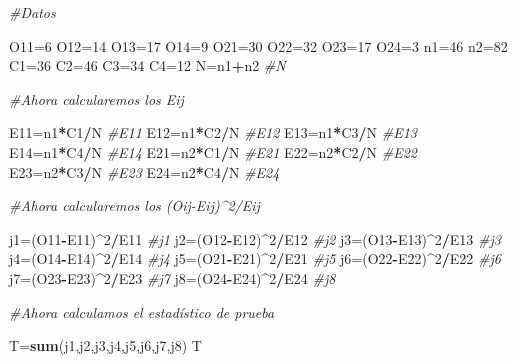 \documentclass[a4paper,oneside,openany]{book}
\newenvironment{Shaded}{\begin{snugshade}}{\end{snugshade}}
\newcommand{\KeywordTok}[1]{\textcolor[rgb]{0.13,0.29,0.53}{\textbf{#1}}}
\newcommand{\DecValTok}[1]{\textcolor[rgb]{0.00,0.00,0.81}{#1}}
\newcommand{\CommentTok}[1]{\textcolor[rgb]{0.56,0.35,0.01}{\textit{#1}}}
\newcommand{\OperatorTok}[1]{\textcolor[rgb]{0.81,0.36,0.00}{\textbf{#1}}}
\newcommand{\NormalTok}[1]{#1}
\begin{document}
\begin{Shaded}
\begin{Highlighting}[]
\CommentTok{#Datos}

\NormalTok{O11=}\DecValTok{6}
\NormalTok{O12=}\DecValTok{14}
\NormalTok{O13=}\DecValTok{17}
\NormalTok{O14=}\DecValTok{9}
\NormalTok{O21=}\DecValTok{30}
\NormalTok{O22=}\DecValTok{32}
\NormalTok{O23=}\DecValTok{17}
\NormalTok{O24=}\DecValTok{3}
\NormalTok{n1=}\DecValTok{46}
\NormalTok{n2=}\DecValTok{82}
\NormalTok{C1=}\DecValTok{36}
\NormalTok{C2=}\DecValTok{46}
\NormalTok{C3=}\DecValTok{34}
\NormalTok{C4=}\DecValTok{12}
\NormalTok{N=n1}\OperatorTok{+}\NormalTok{n2}
\CommentTok{#N}

\CommentTok{#Ahora calcularemos los Eij}

\NormalTok{E11=n1}\OperatorTok{*}\NormalTok{C1}\OperatorTok{/}\NormalTok{N}
\CommentTok{#E11}
\NormalTok{E12=n1}\OperatorTok{*}\NormalTok{C2}\OperatorTok{/}\NormalTok{N}
\CommentTok{#E12}
\NormalTok{E13=n1}\OperatorTok{*}\NormalTok{C3}\OperatorTok{/}\NormalTok{N}
\CommentTok{#E13}
\NormalTok{E14=n1}\OperatorTok{*}\NormalTok{C4}\OperatorTok{/}\NormalTok{N}
\CommentTok{#E14}
\NormalTok{E21=n2}\OperatorTok{*}\NormalTok{C1}\OperatorTok{/}\NormalTok{N}
\CommentTok{#E21}
\NormalTok{E22=n2}\OperatorTok{*}\NormalTok{C2}\OperatorTok{/}\NormalTok{N}
\CommentTok{#E22}
\NormalTok{E23=n2}\OperatorTok{*}\NormalTok{C3}\OperatorTok{/}\NormalTok{N}
\CommentTok{#E23}
\NormalTok{E24=n2}\OperatorTok{*}\NormalTok{C4}\OperatorTok{/}\NormalTok{N}
\CommentTok{#E24}

\CommentTok{#Ahora calcularemos los (Oij-Eij)^2/Eij}

\NormalTok{j1=(O11}\OperatorTok{-}\NormalTok{E11)}\OperatorTok{^}\DecValTok{2}\OperatorTok{/}\NormalTok{E11}
\CommentTok{#j1}
\NormalTok{j2=(O12}\OperatorTok{-}\NormalTok{E12)}\OperatorTok{^}\DecValTok{2}\OperatorTok{/}\NormalTok{E12}
\CommentTok{#j2}
\NormalTok{j3=(O13}\OperatorTok{-}\NormalTok{E13)}\OperatorTok{^}\DecValTok{2}\OperatorTok{/}\NormalTok{E13}
\CommentTok{#j3}
\NormalTok{j4=(O14}\OperatorTok{-}\NormalTok{E14)}\OperatorTok{^}\DecValTok{2}\OperatorTok{/}\NormalTok{E14}
\CommentTok{#j4}
\NormalTok{j5=(O21}\OperatorTok{-}\NormalTok{E21)}\OperatorTok{^}\DecValTok{2}\OperatorTok{/}\NormalTok{E21}
\CommentTok{#j5}
\NormalTok{j6=(O22}\OperatorTok{-}\NormalTok{E22)}\OperatorTok{^}\DecValTok{2}\OperatorTok{/}\NormalTok{E22}
\CommentTok{#j6}
\NormalTok{j7=(O23}\OperatorTok{-}\NormalTok{E23)}\OperatorTok{^}\DecValTok{2}\OperatorTok{/}\NormalTok{E23}
\CommentTok{#j7}
\NormalTok{j8=(O24}\OperatorTok{-}\NormalTok{E24)}\OperatorTok{^}\DecValTok{2}\OperatorTok{/}\NormalTok{E24}
\CommentTok{#j8}

\CommentTok{#Ahora calculamos el estadístico de prueba}

\NormalTok{T=}\KeywordTok{sum}\NormalTok{(j1,j2,j3,j4,j5,j6,j7,j8)}
\NormalTok{T}
\end{Highlighting}
\end{Shaded}
\end{document}
